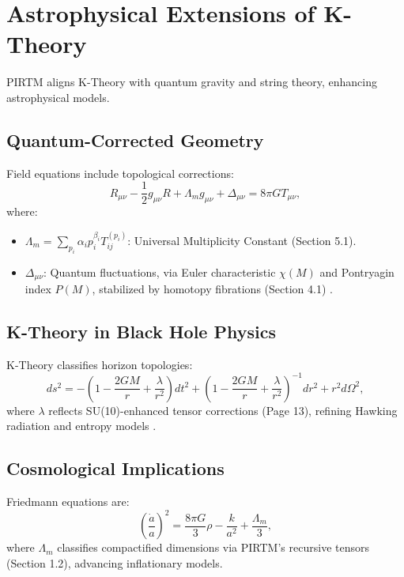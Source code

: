 \documentclass{article}
\theoremstyle{plain}
\begin{document}
\section{Astrophysical Extensions of K-Theory}
PIRTM aligns K-Theory with quantum gravity and string theory, enhancing astrophysical models.

\subsection{Quantum-Corrected Geometry}
Field equations include topological corrections:
\begin{equation}
R_{\mu\nu} - \frac{1}{2} g_{\mu\nu} R + \Lambda_m g_{\mu\nu} + \Delta_{\mu\nu} = 8\pi G T_{\mu\nu},
\end{equation}
where:
\begin{itemize}
    \item \( \Lambda_m = \sum_{p_i} \alpha_i p_i^{\beta_i} T_{ij}^{(p_i)} \): Universal Multiplicity Constant (Section 5.1).
    \item \( \Delta_{\mu\nu} \): Quantum fluctuations, via Euler characteristic \( \chi(M) \) and Pontryagin index \( P(M) \), stabilized by homotopy fibrations (Section 4.1) \cite{witten1995string}.
\end{itemize}

\subsection{K-Theory in Black Hole Physics}
K-Theory classifies horizon topologies:
\begin{equation}
ds^2 = -\left(1 - \frac{2GM}{r} + \frac{\lambda}{r^2}\right) dt^2 + \left(1 - \frac{2GM}{r} + \frac{\lambda}{r^2}\right)^{-1} dr^2 + r^2 d\Omega^2,
\end{equation}
where \( \lambda \) reflects SU(10)-enhanced tensor corrections (Page 13), refining Hawking radiation and entropy models \cite{bekenstein1973entropy}.

\subsection{Cosmological Implications}
Friedmann equations are:
\begin{equation}
\left( \frac{\dot{a}}{a} \right)^2 = \frac{8\pi G}{3} \rho - \frac{k}{a^2} + \frac{\Lambda_m}{3},
\end{equation}
where \( \Lambda_m \) classifies compactified dimensions via PIRTM’s recursive tensors (Section 1.2), advancing inflationary models.
\end{document}
